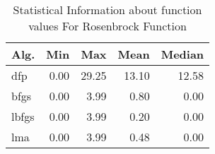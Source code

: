 \begin{table}
\centering
\caption{Statistical Information about function values For Rosenbrock Function}
\label{function_values:rosenbrock30d}
\begin{tabular}{lrrrr}
\toprule
 Alg. &  Min &   Max &  Mean &  Median \\
\midrule
  dfp & 0.00 & 29.25 & 13.10 &   12.58 \\
 bfgs & 0.00 &  3.99 &  0.80 &    0.00 \\
lbfgs & 0.00 &  3.99 &  0.20 &    0.00 \\
  lma & 0.00 &  3.99 &  0.48 &    0.00 \\
\bottomrule
\end{tabular}
\end{table}
